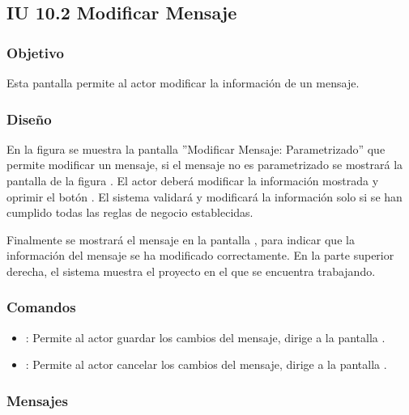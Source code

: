 \subsection{IU 10.2 Modificar Mensaje}

\subsubsection{Objetivo}
	Esta pantalla permite al actor modificar la información de un mensaje.
\subsubsection{Diseño}
	En la figura  se muestra la pantalla ''Modificar Mensaje: Parametrizado'' que permite modificar un mensaje, si el mensaje no es parametrizado se mostrará la pantalla de la figura . El actor deberá modificar la información mostrada y oprimir el botón  . El sistema validará y modificará la información solo si se han cumplido todas las reglas de negocio establecidas.
	
	Finalmente se mostrará el mensaje  en la pantalla , para indicar que la información del mensaje se ha modificado correctamente.
	En la parte superior derecha, el sistema muestra el proyecto en el que se encuentra trabajando.

\subsubsection{Comandos}
\begin{itemize}
	\item {}: Permite al actor guardar los cambios del mensaje, dirige a la pantalla .
	\item {}: Permite al actor cancelar los cambios del mensaje, dirige a la pantalla .
\end{itemize}

\subsubsection{Mensajes}

